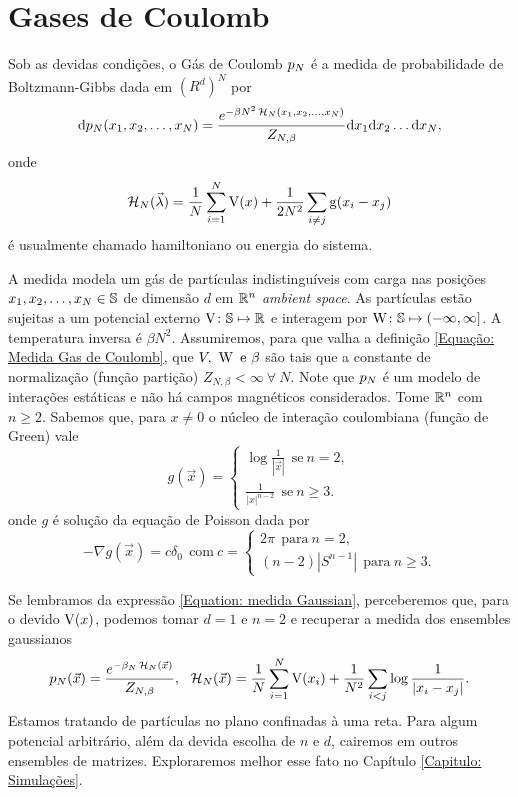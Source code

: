 \section{Gases de Coulomb}
\label{Section: Gases de Coulomb}

Sob as devidas condições, o Gás de Coulomb $p_N$ é \cite{CoulombGaschafai} a medida de probabilidade de Boltzmann-Gibbs dada em $(R^d)^N$ por 
\begin{equation}
	\dd p_N(x_1, x_2, \dots, x_N) = \frac{e^{-\beta N^2 \operatorname{\mathcal{H}}_N(x_1, x_2, \dots, x_N)}}{Z_{N,\beta}} \dd x_1  \dd x_2  \dots  \dd x_N,
	\label{Equação: Medida Gas de Coulomb}
\end{equation}
onde $$\operatorname{\mathcal{H}}_N(\vec{\lambda}) = \frac{1}{N} \sum_{i = 1}^{N} \operatorname{V}(x) + \frac{1}{2N^2} \sum_{i \neq j} \operatorname{g}(x_i - x_j)$$ é usualmente chamado hamiltoniano ou energia do sistema.

A medida modela um gás de partículas indistinguíveis com carga nas posições $x_1, x_2, \dots, x_N \in \mathbb{S}$ de dimensão $d$ em $\mathbb{R}^n$ \textit{ambient space}. As partículas estão sujeitas a um potencial externo $\operatorname{V} \colon \mathbb{S} \mapsto \mathbb{R}$ e interagem por $\operatorname{W} \colon \mathbb{S} \mapsto (-\infty, \infty]$. A temperatura inversa é $\beta N^2$. Assumiremos, para que valha a definição \ref{Equação: Medida Gas de Coulomb}, que $V, \ \W \ \text{e} \ \beta$ são tais que a constante de normalização (função partição) $Z_{N, \beta} < \infty \ \forall \ N$. Note que $p_N$ é um modelo de interações estáticas e não há campos magnéticos considerados. Tome $\mathbb{R}^n$ com $n \geq 2$. Sabemos que, para $x \neq 0$ o núcleo de interação coulombiana (função de Green) vale $$
	g(\vec{x}) =
	\begin{cases}
			\log \frac{1}{|\vec{x}|} \ \ \text{se} \ n = 2,\\
			\frac{1}{|x|^{n-2}} \ \ \text{se} \ n \geq 3.
	\end{cases}
$$ onde $g$ é solução da equação de Poisson dada por $$
	- \nabla g(\vec{x}) = c\delta_0 \ \ \text{com} \ c = 
	\begin{cases}
		2\pi \ \ \text{para} \ n = 2,\\
		(n-2) |S^{n-1}| \ \ \text{para} \ n \geq 3.
	\end{cases}
$$

Se lembramos da expressão \ref{Equation: medida Gaussian}, perceberemos que, para o devido $\operatorname{V}(x)$, podemos tomar $d=1$ e $n = 2$ e recuperar a medida dos ensembles gaussianos 
\begin{equation}
	p_N(\vec{x}) = \frac{e^{-\beta_N \operatorname{\mathcal{H}}_N(\vec{x})}}{Z_{N,\beta}}, \ \ \operatorname{\mathcal{H}}_N(\vec{x}) = \frac{1}{N} \sum_{i = 1}^{N} \operatorname{V}(x_i) + \frac{1}{N^2} \sum_{i < j} \log{\frac{1}{|x_i - x_j|}}.
	\label{Equation: Medida Log V}
\end{equation}
Estamos tratando de partículas no plano confinadas à uma reta. Para algum potencial arbitrário, além da devida escolha de $n$ e $d$, cairemos em outros ensembles de matrizes. Exploraremos melhor esse fato no Capítulo \ref{Capitulo: Simulações}.